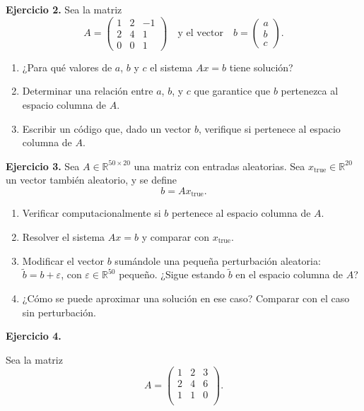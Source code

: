 \documentclass[12pt,a4paper]{article}
\newcommand\1{\mbox{\,\vrule height-0.8pt depth1.0pt width2pc\,}}
\newcommand\2{\mbox{\,\vrule height-0.8pt depth1.0pt width1pc\,}}
\begin{document}
\textbf{Ejercicio 2.} Sea la matriz
\[
A = \begin{pmatrix}
1 & 2 & -1 \\
2 & 4 & 1 \\
0 & 0 & 1
\end{pmatrix}
\quad \text{y el vector} \quad
b = \begin{pmatrix} a \\ b \\ c \end{pmatrix}.
\]
\begin{enumerate}
    \item ¿Para qué valores de $a$, $b$ y $c$ el sistema $Ax = b$ tiene solución?
    \item Determinar una relación entre $a$, $b$, y $c$ que garantice que $b$ pertenezca al espacio columna de $A$.
    \item Escribir un código que, dado un vector $b$, verifique si pertenece al espacio columna de $A$.
\end{enumerate}

\vspace{0.5cm}

\textbf{Ejercicio 3.} Sea $A \in \mathbb{R}^{50 \times 20}$ una matriz con entradas aleatorias. Sea $x_{\text{true}} \in \mathbb{R}^{20}$ un vector también aleatorio, y se define
\[
b = Ax_{\text{true}}.
\]
\begin{enumerate}
    \item Verificar computacionalmente si $b$ pertenece al espacio columna de $A$.
    \item Resolver el sistema $Ax = b$ y comparar con $x_{\text{true}}$.
    \item Modificar el vector $b$ sumándole una pequeña perturbación aleatoria: $\tilde{b} = b + \varepsilon$, con $\varepsilon \in \mathbb{R}^{50}$ pequeño. ¿Sigue estando $\tilde{b}$ en el espacio columna de $A$?
    \item ¿Cómo se puede aproximar una solución en ese caso? Comparar con el caso sin perturbación.
\end{enumerate}

\textbf{Ejercicio 4.}

Sea la matriz
\[
A =
\begin{pmatrix}
1 & 2 & 3 \\
2 & 4 & 6 \\
1 & 1 & 0 \\
\end{pmatrix}.
\]
\end{document}
